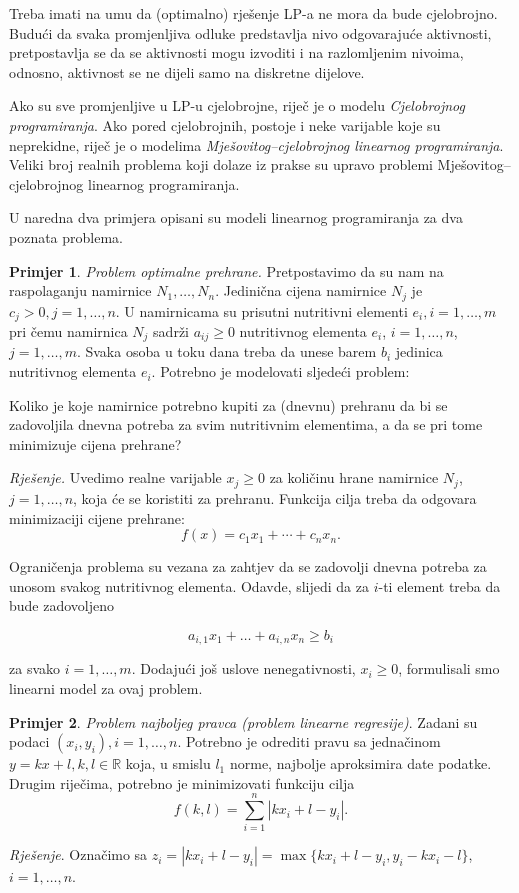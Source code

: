 \documentclass[a4paper, utf8, 11pt, colorlinks]{book}
\theoremstyle{definition}
\newtheorem{primjer}{Primjer}[chapter]
\begin{document}
Treba imati na umu da (optimalno) rješenje LP-a ne mora da bude cjelobrojno. Budući da svaka promjenljiva odluke predstavlja nivo odgovarajuće aktivnosti, pretpostavlja se da se aktivnosti mogu izvoditi i na razlomljenim nivoima, odnosno, aktivnost  se ne dijeli samo na diskretne dijelove. 

Ako su sve promjenljive u LP-u cjelobrojne, riječ je o modelu \emph{Cjelobrojnog programiranja}. Ako pored cjelobrojnih, postoje i neke varijable koje su neprekidne, riječ je o modelima \emph{Mješovitog--cjelobrojnog linearnog programiranja}. Veliki broj realnih problema koji dolaze iz prakse su upravo problemi Mješovitog--cjelobrojnog linearnog programiranja.
 

U naredna dva primjera opisani su modeli linearnog programiranja za dva poznata problema. 
\begin{primjer}
\emph{Problem optimalne prehrane.} Pretpostavimo da su nam na raspolaganju namirnice $N_1, \ldots, N_n$. Jedinična cijena namirnice $N_j$ je $c_j>0, j = 1, \ldots, n$. U namirnicama su prisutni nutritivni elementi $e_i,i=1,\ldots,m$ pri čemu
namirnica $N_j$ sadrži $a_{ij} \geq 0$ nutritivnog elementa $e_i$, $i = 1, \ldots, n$, $j = 1, \ldots, m$. Svaka osoba u toku dana treba da unese barem $b_i$
jedinica nutritivnog elementa $e_i$. Potrebno je modelovati
sljedeći problem: 

Koliko je koje namirnice potrebno kupiti za (dnevnu) prehranu da bi se zadovoljila dnevna
potreba za svim nutritivnim elementima, a da se pri tome minimizuje cijena prehrane?
\end{primjer}
 
 \emph{Rješenje.}  Uvedimo realne varijable $x_j \geq 0$ za količinu hrane namirnice $N_j$, $j = 1, \ldots, n$, koja će se koristiti za prehranu. Funkcija cilja treba da odgovara minimizaciji cijene prehrane:
 $$f(x) = c_1 x_1 + \cdots + c_n x_n.$$
 
 Ograničenja problema su vezana za zahtjev da se zadovolji dnevna potreba za unosom svakog nutritivnog elementa. Odavde, slijedi da za $i$-ti element treba da bude zadovoljeno
 
 $$ a_{i,1} x_1 + \ldots + a_{i,n} x_n \geq b_i $$
 
 za svako $i=1,\ldots,m$. Dodajući još uslove nenegativnosti, $x_i \geq 0$, formulisali smo linearni model za ovaj problem.  
 \begin{primjer}
\emph{Problem najboljeg pravca (problem linearne regresije)}. Zadani su podaci $(x_i, y_i), i = 1, \ldots , n$. Potrebno je odrediti pravu sa jednačinom $y = k x + l,
k, l \in \mathbb{R}$ koja, u smislu $l_1$ norme, najbolje aproksimira date podatke. Drugim riječima, potrebno je minimizovati  funkciju cilja $$f(k, l) = \sum_{i=1}^n |k x_i + l - y_i|.$$
\end{primjer}
\emph{Rješenje}.
Označimo sa $z_i = |k x_i + l - y_i| = \max\{k x_i + l - y_i, y_i - k x_i - l \}$, $i=1,\ldots,n$. 
\end{document}

